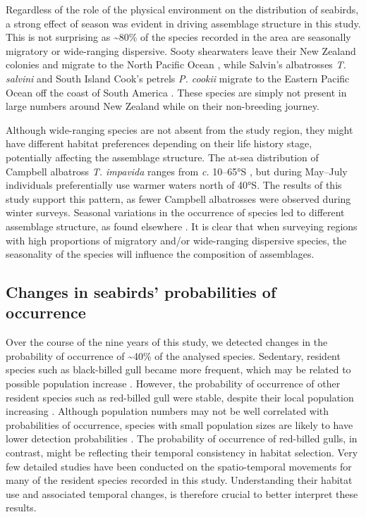 \documentclass[preprint, 3p, authoryear]{elsarticle} %
\begin{document}
Regardless of the role of the physical environment on the distribution of seabirds, a strong effect of season was evident in driving assemblage structure in this study. This is not surprising as \textasciitilde80\% of the species recorded in the area are seasonally migratory or wide-ranging dispersive. Sooty shearwaters leave their New Zealand colonies and migrate to the North Pacific Ocean \citep{shaffer2006}, while Salvin's albatrosses \emph{T. salvini} and South Island Cook's petrels \emph{P. cookii} migrate to the Eastern Pacific Ocean off the coast of South America \citep{rayner2011, fischer2023}. These species are simply not present in large numbers around New Zealand while on their non-breeding journey.

Although wide-ranging species are not absent from the study region, they might have different habitat preferences depending on their life history stage, potentially affecting the assemblage structure. The at-sea distribution of Campbell albatross \emph{T. impavida} ranges from \emph{c.} 10--65°S \citep{thompson2021}, but during May--July individuals preferentially use warmer waters north of 40°S. The results of this study support this pattern, as fewer Campbell albatrosses were observed during winter surveys. Seasonal variations in the occurrence of species led to different assemblage structure, as found elsewhere \citep{renner2008, hunt2014, simon2024}. It is clear that when surveying regions with high proportions of migratory and/or wide-ranging dispersive species, the seasonality of the species will influence the composition of assemblages.

\hypertarget{changes-in-seabirds-probabilities-of-occurrence}{%
\subsection{Changes in seabirds' probabilities of occurrence}\label{changes-in-seabirds-probabilities-of-occurrence}}

Over the course of the nine years of this study, we detected changes in the probability of occurrence of \textasciitilde40\% of the analysed species. Sedentary, resident species such as black-billed gull became more frequent, which may be related to possible population increase \citep{mischler2018}. However, the probability of occurrence of other resident species such as red-billed gull were stable, despite their local population increasing \citep{perriman2012}. Although population numbers may not be well correlated with probabilities of occurrence, species with small population sizes are likely to have lower detection probabilities \citep{mccarthy2013}. The probability of occurrence of red-billed gulls, in contrast, might be reflecting their temporal consistency in habitat selection. Very few detailed studies have been conducted on the spatio-temporal movements for many of the resident species recorded in this study. Understanding their habitat use and associated temporal changes, is therefore crucial to better interpret these results.
\end{document}
